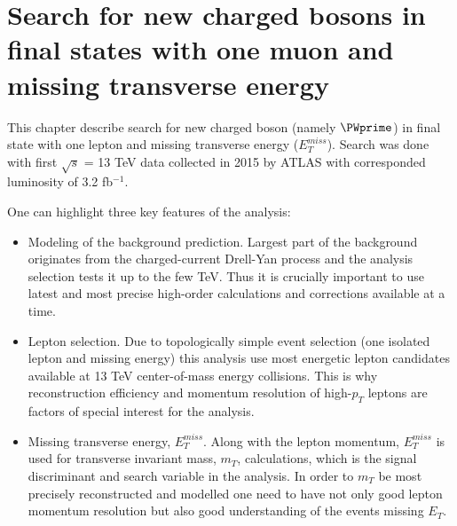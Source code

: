 

\chapter{Search for new charged bosons in final states with one muon and missing transverse energy}
\label{chap:Wprime}





This chapter describe search for new charged boson (namely $\PWprime$) in final state with one lepton and missing transverse energy ($E_T^{miss}$).
Search was done with first $\sqrt{s}$ = 13 TeV data collected in 2015 by ATLAS with corresponded luminosity of 3.2 fb$^{-1}$.

One can highlight three key features of the analysis:
\begin{itemize}
 \item Modeling of the background prediction. 
 Largest part of the background originates from the charged-current Drell-Yan process and the analysis selection tests it up to the few TeV.
 Thus it is crucially important to use latest and most precise high-order calculations and corrections available at a time.
 \item Lepton selection. Due to topologically simple event selection (one isolated lepton and missing energy) 
 this analysis use most energetic lepton candidates available at 13 TeV center-of-mass energy collisions.
 This is why reconstruction efficiency and momentum resolution of high-$p_T$ leptons are factors of special interest for the analysis.
 \item Missing transverse energy, $E_T^{miss}$. Along with the lepton momentum, $E_T^{miss}$ is used for transverse invariant mass, $m_T$, calculations,
 which is the signal discriminant and search variable in the analysis. In order to $m_T$ be most precisely reconstructed and modelled one need
 to have not only good lepton momentum resolution but also good understanding of the events missing $E_T$.
\end{itemize}




